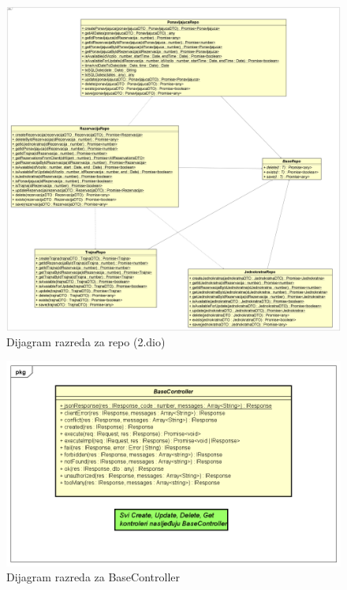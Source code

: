 		\begin{figure}[H]
			\includegraphics[width=1\linewidth]{dijagrami/Dijagram razreda - Repo_2.png}
			\caption{Dijagram razreda za repo (2.dio)}
			\label{fig:Dijagram razreda - Repo2} 
		\end{figure}

		\begin{figure}[H]
	        \includegraphics[width=1\linewidth]{dijagrami/Dijagram razreda - BaseController.png}
        	\caption{Dijagram razreda za BaseController}
        	\label{fig:Dijagram razreda - BaseController}
        \end{figure}
		
